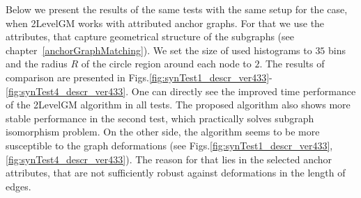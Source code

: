 Below we present the results of the same tests with the same setup for the case, when 2LevelGM works with attributed anchor graphs. For that we use the attributes, that capture geometrical structure of the subgraphs (see chapter~\ref{anchorGraphMatching}). We set the size of used histograms to $35$ bins and the radius $R$ of the circle region around each node to $2$. The results of comparison are presented in Figs.\ref{fig:synTest1_descr_ver433}-\ref{fig:synTest4_descr_ver433}. One can directly see the improved time performance of the 2LevelGM algorithm in all tests. The proposed algorithm also shows more stable performance in the second test, which practically solves subgraph isomorphism problem. On the other side, the algorithm seems to be more susceptible to the graph deformations (see Figs.\ref{fig:synTest1_descr_ver433}, \ref{fig:synTest4_descr_ver433}). The reason for that lies in the selected anchor attributes, that are not sufficiently robust against deformations in the length of edges.

